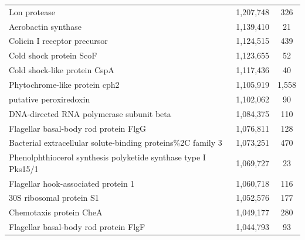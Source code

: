 \begin{singlespace}
\begin{longtable}{p{} cc}
                                                                              Lon protease &                   1,207,748 &           326 \\
                                                                       Aerobactin synthase &                   1,139,410 &            21 \\
                                                              Colicin I receptor precursor &                   1,124,515 &           439 \\
                                                                   Cold shock protein ScoF &                   1,123,655 &            52 \\
                                                              Cold shock-like protein CspA &                   1,117,436 &            40 \\
                                                             Phytochrome-like protein cph2 &                   1,105,919 &         1,558 \\
                                                                    putative peroxiredoxin &                   1,102,062 &            90 \\
                                                  DNA-directed RNA polymerase subunit beta &                   1,084,375 &           110 \\
                                                     Flagellar basal-body rod protein FlgG &                   1,076,811 &           128 \\
                               Bacterial extracellular solute-binding proteins\%2C family 3 &                   1,073,251 &           470 \\
                            Phenolphthiocerol synthesis polyketide synthase type I Pks15/1 &                   1,069,727 &            23 \\
                                                       Flagellar hook-associated protein 1 &                   1,060,718 &           116 \\
                                                                  30S ribosomal protein S1 &                   1,052,576 &           177 \\
                                                                   Chemotaxis protein CheA &                   1,049,177 &           280 \\
                                                     Flagellar basal-body rod protein FlgF &                   1,044,793 &            93 \\

\end{longtable}
\end{singlespace}
